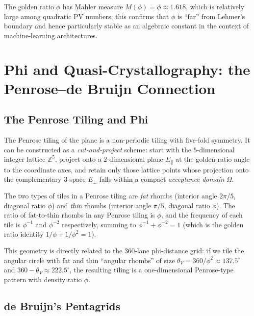 The golden ratio $\phi$ has Mahler measure
$M(\phi) = \phi \approx 1.618$, which is
relatively large among quadratic PV numbers;
this confirms that $\phi$ is ``far'' from Lehmer's
boundary and hence particularly stable as an
algebraic constant in the context of
machine-learning architectures.

\section{Phi and Quasi-Crystallography: the Penrose--de Bruijn Connection}
\label{sec:quasicrystallography}

\subsection{The Penrose Tiling and Phi}
\label{subsec:penrose-phi}

The Penrose tiling of the plane is a non-periodic
tiling with five-fold symmetry.  It can be
constructed as a \emph{cut-and-project} scheme:
start with the $5$-dimensional integer lattice
$\mathbb{Z}^5$, project onto a $2$-dimensional
plane $E_\parallel$ at the golden-ratio angle to
the coordinate axes, and retain only those lattice
points whose projection onto the complementary
$3$-space $E_\perp$ falls within a compact
\emph{acceptance domain} $\Omega$.

The two types of tiles in a Penrose tiling are
\emph{fat} rhombs (interior angle $2\pi/5$,
diagonal ratio $\phi$) and \emph{thin} rhombs
(interior angle $\pi/5$, diagonal ratio $\phi$).
The ratio of fat-to-thin rhombs in any Penrose
tiling is $\phi$, and the frequency of each
tile is $\phi^{-1}$ and $\phi^{-2}$ respectively,
summing to $\phi^{-1} + \phi^{-2} = 1$ (which is
the golden ratio identity $1/\phi + 1/\phi^2 = 1$).

This geometry is directly related to the
360-lane phi-distance grid: if we tile the angular
circle with fat and thin ``angular rhombs'' of
size $\theta_V = 360/\phi^2 \approx 137.5^\circ$
and $360 - \theta_V \approx 222.5^\circ$,
the resulting tiling is a one-dimensional
Penrose-type pattern with density ratio $\phi$.

\subsection{de Bruijn's Pentagrids}
\label{subsec:debruijn}

